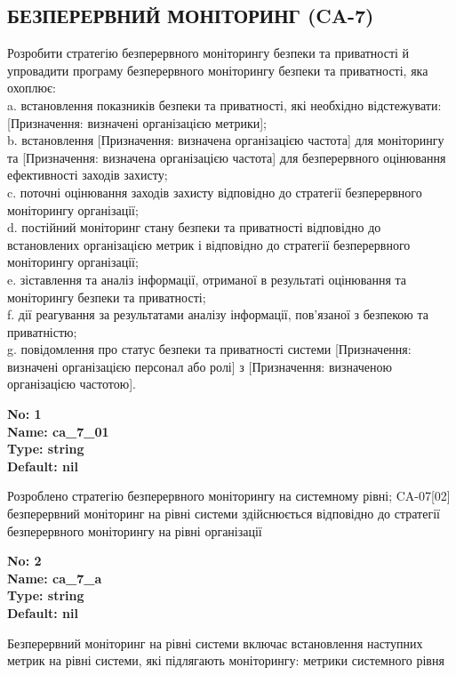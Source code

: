 \documentclass{article}
\begin{document}
\subsection{БЕЗПЕРЕРВНИЙ МОНІТОРИНГ (CA-7)}
Розробити стратегію безперервного моніторингу безпеки та приватності й упровадити програму безперервного моніторингу безпеки та приватності, яка охоплює:\\ 
a. встановлення показників безпеки та приватності, які необхідно відстежувати: [Призначення: визначені організацією метрики];\\ 
b. встановлення [Призначення: визначена організацією частота] для моніторингу та [Призначення: визначена організацією частота] для безперервного оцінювання ефективності заходів захисту;\\ 
c. поточні оцінювання заходів захисту відповідно до стратегії безперервного моніторингу організації;\\ 
d. постійний моніторинг стану безпеки та приватності відповідно до встановлених організацією метрик і відповідно до стратегії безперервного моніторингу організації;\\ 
e. зіставлення та аналіз інформації, отриманої в результаті оцінювання та моніторингу безпеки та приватності;\\ 
f. дії реагування за результатами аналізу інформації, пов'язаної з безпекою та приватністю;\\ 
g. повідомлення про статус безпеки та приватності системи [Призначення: визначені організацією персонал або ролі] з [Призначення: визначеною організацією частотою].

\vspace{10pt}
{\footnotesize\bfseries
No: 1\\
Name: ca\_\allowbreak{}7\_\allowbreak{}01\\
Type: string\\
Default: nil
}

{\footnotesize Розроблено стратегію безперервного моніторингу на системному рівні; CA-07[02] безперервний моніторинг на рівні системи здійснюється відповідно до стратегії безперервного моніторингу на рівні організації}


{\footnotesize\bfseries
No: 2\\
Name: ca\_\allowbreak{}7\_\allowbreak{}a\\
Type: string\\
Default: nil
}

{\footnotesize Безперервний моніторинг на рівні системи включає встановлення наступних метрик на рівні системи, які підлягають моніторингу: метрики системного рівня}
\end{document}

